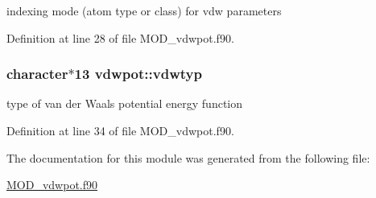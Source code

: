 indexing mode (atom type or class) for vdw parameters 



Definition at line 28 of file M\-O\-D\-\_\-vdwpot.\-f90.

\hypertarget{classvdwpot_a932f417f3d7a4ecc44b17bcb3d24b9fb}{
\subsubsection[{vdwtyp}]{\setlength{\rightskip}{0pt plus 5cm}character$\ast$13 vdwpot\-::vdwtyp}}\label{classvdwpot_a932f417f3d7a4ecc44b17bcb3d24b9fb}


type of van der Waals potential energy function 



Definition at line 34 of file M\-O\-D\-\_\-vdwpot.\-f90.



The documentation for this module was generated from the following file\-:\begin{DoxyCompactItemize}
\item 
\hyperlink{MOD__vdwpot_8f90}{M\-O\-D\-\_\-vdwpot.\-f90}\end{DoxyCompactItemize}
